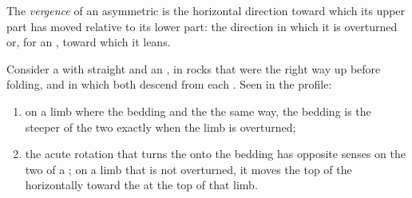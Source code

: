 \begin{definition}[Vergence]\label{def:b1:faults-folds-fabrics:vergence}
The \emph{vergence} of an asymmetric  is the horizontal
direction toward which its upper part has moved relative to its lower part:
the direction in which it is overturned or, for an , toward which
it leans.
\end{definition}

\begin{proposition}\label{prop:b1:faults-folds-fabrics:cleavage-bedding}
Consider a  with straight  and an , in rocks
that were the right way up before folding, and in which both  descend
from each  . Seen in the profile:
\begin{enumerate}[label=(\alph*)]
  \item on a limb where the bedding and the   the same way, the
        bedding is the steeper of the two exactly when the limb is
        overturned;
  \item the acute rotation that turns the  onto the bedding has
        opposite senses on the two  of a ; on a limb that is not
        overturned, it moves the top of the  horizontally toward the
          at the top of that limb.
\end{enumerate}
\end{proposition}

